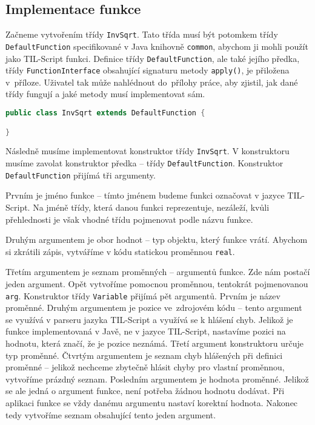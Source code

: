 \subsection{Implementace funkce}

Začneme vytvořením třídy \lstinline{InvSqrt}. Tato třída musí být potomkem třídy
\lstinline{DefaultFunction} specifikované v Java knihovně \lstinline{common}, abychom ji mohli
použít jako TIL-Script funkci. Definice třídy \lstinline{DefaultFunction}, ale také jejího předka,
třídy \lstinline{FunctionInterface} obsahující signaturu metody \lstinline{apply()}, je přiložena
v~příloze. Uživatel tak může nahlédnout do~přílohy práce, aby zjistil, jak dané třídy fungují a jaké
metody musí implementovat sám.

\begin{lstlisting}[caption={Třída InvSqrt}, language=Java]
public class InvSqrt extends DefaultFunction {

}
\end{lstlisting}

Následně musíme implementovat konstruktor třídy \lstinline{InvSqrt}. V konstruktoru musíme zavolat
konstruktor předka -- třídy \lstinline{DefaultFunction}. Konstruktor \lstinline{DefaultFunction}
přijímá tři argumenty.

Prvním je jméno funkce -- tímto jménem budeme funkci označovat v jazyce TIL-Script. Na jméně třídy,
která danou funkci reprezentuje, nezáleží, kvůli přehlednosti je však vhodné třídu pojmenovat podle
názvu funkce.

Druhým argumentem je obor hodnot -- typ objektu, který funkce vrátí. Abychom si zkrátili zápis,
vytváříme v kódu statickou proměnnou \lstinline{real}.

Třetím argumentem je seznam proměnných -- argumentů funkce. Zde nám postačí jeden argument. Opět
vytvoříme pomocnou proměnnou, tentokrát pojmenovanou \lstinline{arg}. Konstruktor třídy
\lstinline{Variable} přijímá pět argumentů. Prvním je název proměnné. Druhým argumentem je pozice
ve~zdrojovém kódu -- tento argument se využívá v parseru jazyka TIL-Script a využívá se k hlášení
chyb. Jelikož je funkce implementovaná v Javě, ne v jazyce TIL-Script, nastavíme pozici na hodnotu,
která značí, že je pozice neznámá. Třetí argument konstruktoru určuje typ proměnné. Čtvrtým
argumentem je seznam chyb hlášených při definici proměnné -- jelikož nechceme zbytečně hlásit chyby
pro vlastní proměnnou, vytvoříme prázdný seznam. Posledním argumentem je hodnota proměnné. Jelikož
se ale jedná o argument funkce, není potřeba žádnou hodnotu dodávat. Při aplikaci funkce se vždy
danému argumentu nastaví korektní hodnota. Nakonec tedy vytvoříme seznam obsahující tento jeden
argument.

